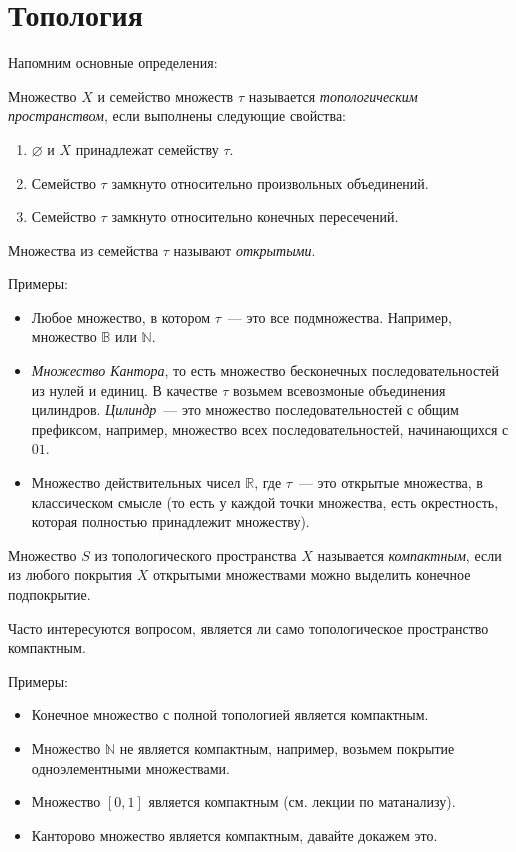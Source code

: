 \documentclass{article}
\begin{document}
\section{Топология}

Напомним основные определения:

Множество $X$ и семейство множеств $\tau$ называется \emph{топологическим пространством},
если выполнены следующие свойства:
\begin{enumerate}
\item
$\varnothing$ и $X$ принадлежат семейству $\tau$.

\item
Семейство $\tau$ замкнуто относительно произвольных объединений.

\item
Семейство $\tau$ замкнуто относительно конечных пересечений.
\end{enumerate}

Множества из семейства $\tau$ называют \emph{открытыми}.

Примеры:
\begin{itemize}
\item
Любое множество, в котором $\tau$~--- это все подмножества.
Например, множество $\mathbb{B}$ или $\mathbb{N}$.

\item
\emph{Множество Кантора}, то есть множество бесконечных последовательностей из нулей и единиц.
В качестве $\tau$ возьмем всевозмоные объединения цилиндров. \emph{Цилиндр}~--- это множество
последовательностей с общим префиксом, например, множество всех последовательностей,
начинающихся с $01$.

\item
Множество действительных чисел $\mathbb{R}$, где $\tau$~--- это открытые множества,
в классическом смысле (то есть у каждой точки множества, есть окрестность, которая
полностью принадлежит множеству).
\end{itemize}

\medskip

Множество $S$ из топологического пространства $X$ называется
\emph{компактным}, если из любого покрытия $X$ открытыми множествами можно
выделить конечное подпокрытие.

Часто интересуются вопросом, является ли само топологическое пространство компактным.

Примеры:
\begin{itemize}
\item Конечное множество с полной топологией является компактным.
\item Множество $\mathbb{N}$ не является компактным, например,
    возьмем покрытие одноэлементными множествами.
\item Множество $[0, 1]$ является компактным (см. лекции по матанализу).
\item Канторово множество является компактным, давайте докажем это.
\end{itemize}
\end{document}
